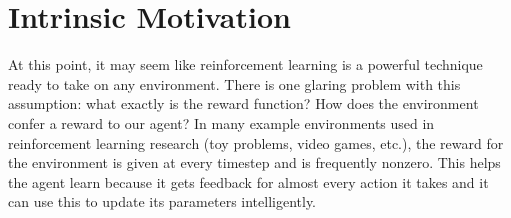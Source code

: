 \documentclass[journal, onecolumn, 12pt, draftclsnofoot]{IEEEtran}
\begin{document}
	\newpage
	\section{Intrinsic Motivation}
	\label{sec:intrinsic-motivation}
	\par At this point, it may seem like reinforcement learning is a powerful technique ready to take on any environment. There is one glaring problem with this assumption: what exactly is the reward function? How does the environment confer a reward to our agent? In many example environments used in reinforcement learning research (toy problems, video games, etc.), the reward for the environment is given at every timestep and is frequently nonzero. This helps the agent learn because it gets feedback for almost every action it takes and it can use this to update its parameters intelligently.
\end{document}

